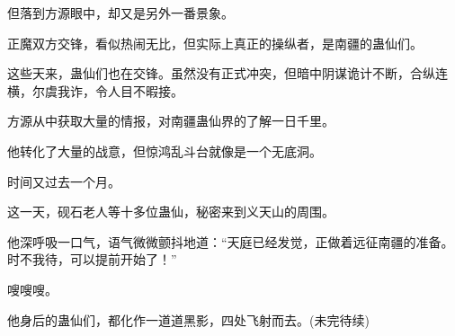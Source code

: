\begin{this_body}
但落到方源眼中，却又是另外一番景象。

正魔双方交锋，看似热闹无比，但实际上真正的操纵者，是南疆的蛊仙们。

这些天来，蛊仙们也在交锋。虽然没有正式冲突，但暗中阴谋诡计不断，合纵连横，尔虞我诈，令人目不暇接。

方源从中获取大量的情报，对南疆蛊仙界的了解一日千里。

他转化了大量的战意，但惊鸿乱斗台就像是一个无底洞。

时间又过去一个月。

这一天，砚石老人等十多位蛊仙，秘密来到义天山的周围。

他深呼吸一口气，语气微微颤抖地道：“天庭已经发觉，正做着远征南疆的准备。时不我待，可以提前开始了！”

嗖嗖嗖。

他身后的蛊仙们，都化作一道道黑影，四处飞射而去。(未完待续)

\end{this_body}

